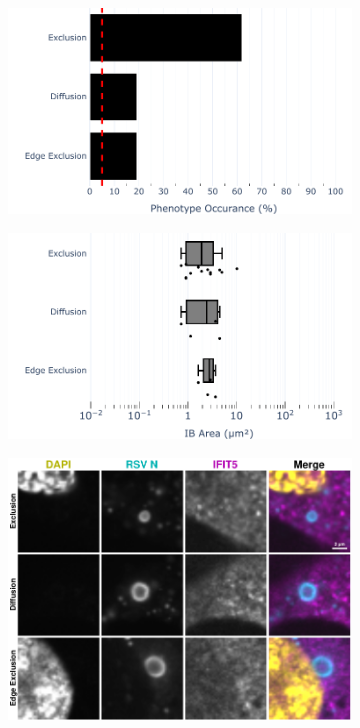 \begin{figure}
    \begin{subfigure}{0.495\textwidth}
        \caption{}
        \includegraphics[width=1\linewidth]{09. Chapter 4/Figs/02. Infection/03. IFIT5/04. bar_i5_beas2b.pdf} 
    \end{subfigure}
    \begin{subfigure}{0.495\textwidth}
        \caption{}
        \includegraphics[width=1\linewidth]{09. Chapter 4/Figs/02. Infection/03. IFIT5/05. box_i5_beas2b.pdf}
    \end{subfigure}
    \begin{subfigure}{1\textwidth}
        \centering
        \caption{}
        \includegraphics[width=1\linewidth]{09. Chapter 4/Figs/02. Infection/03. IFIT5/06. beas2b i5.pdf}

\end{subfigure}
\end{figure}
